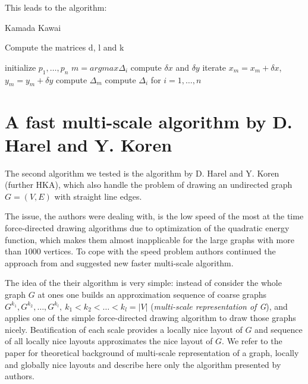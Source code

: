 \documentclass[12pt,a4paper]{article}
\begin{document}
This leads to the algorithm:

\begin{algorithm}
\caption{Kamada Kawai \cite{TomihisaKamada1989}}
\label{KKA}
\begin{algorithmic}[1]
\item Compute the matrices d, l and k
\item initialize $p_1 , \dots, p_n$ 
	\State $ m = argmax \Delta_i $
		\State compute $\delta x$ and $\delta y$
		\State iterate $x_m = x_m + \delta x$, $y_m = y_m + \delta y$
		\State compute $\Delta_m$
	\EndWhile
	\State compute $\Delta_i$ for $i=1, \dots, n$
\EndWhile
\end{algorithmic}

\end{algorithm}

\newpage

\section{A fast multi-scale algorithm by D. Harel and Y. Koren}
\label{section2}

The second algorithm we tested is the algorithm by D. Harel and Y. Koren \cite{DavidHarel2002} (further HKA), which also handle the problem of drawing an undirected graph $G=(V,E)$ with straight line edges.

The issue, the authors were dealing with, is the low speed of the most at the time force-directed drawing algorithms due to optimization of the quadratic energy function, which makes them almost inapplicable for the large graphs with more than $1000$ vertices. To cope with the speed problem authors continued the approach from \cite{HadanyHarel2001} and suggested new faster multi-scale algorithm.

The idea of the their algorithm is very simple: instead of consider the whole graph $G$ at ones one builds an approximation sequence of coarse graphs $G^{k_1}, G^{k_2}, \dots, G^{k_l},\ k_1<k_2<\dots<k_l=|V|$ ({\it multi-scale representation of G}), and applies one of the simple force-directed drawing algorithm to draw those graphs nicely. Beatification of each scale provides a locally nice layout of $G$ and sequence of all locally nice layouts approximates the nice layout of $G$. We refer to the paper \cite{DavidHarel2002} for theoretical background of multi-scale representation of a graph, locally and globally nice layouts and describe here only the algorithm presented by authors.
\end{document}
